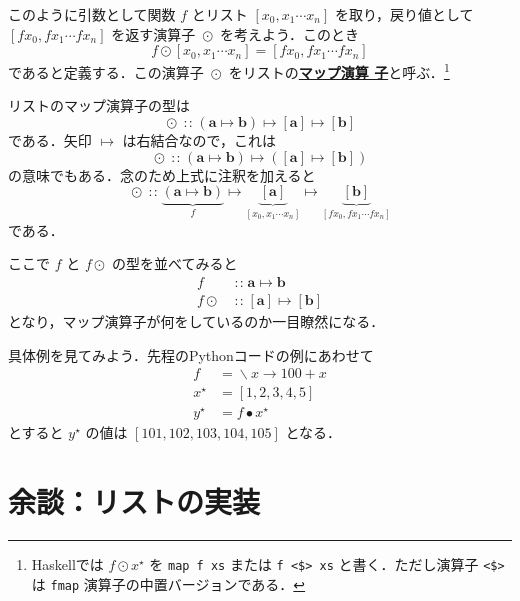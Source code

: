\documentclass[a5paper,twoside,fleqn]{jsbook}
\newcommand{\programminglanguage}[1]{\textsf{#1}}
\newcommand{\haskell}{\programminglanguage{Haskell}}
\newcommand{\python}{\programminglanguage{Python}}
\newcommand{\keyword}[1]{{\underline{\textbf{#1}}}}
\newcommand{\code}[1]{\texttt{#1}}
\DeclareMathOperator{\mIn}{{:\!:}}
\DeclareMathOperator{\mLambda}{\backslash}
\DeclareMathOperator{\mLambdaArrow}{\rightarrow}
\DeclareMathOperator{\mMap}{\bullet}
\DeclareMathOperator{\mMapList}{\odot}
\DeclareMathOperator{\mMapsTo}{\mapsto}
\newcommand{\mType}[1]{\mathbf{#1}}
\newcommand{\mListType}[1]{[\mType{#1}]}
\newcommand{\mListWith}[1]{\left[#1\right]}
\newcommand{\mList}[1]{{#1}^\mathrm{\star}}
\newcommand{\mLambdaExp}[2]{\mLambda{#1}\mLambdaArrow{#2}}
\newcommand{\mProj}[2]{#1\mMapsTo#2}
\begin{document}
このように引数として関数 $f$ とリスト $\mListWith{x_0,x_1\dotsb x_n}$
を取り，戻り値として $\mListWith{fx_0,fx_1\dotsb fx_n}$ を返す演算子
$\mMapList$ を考えよう．このとき
\begin{equation}
f\mMapList\mListWith{x_0,x_1\dotsb x_n} =\mListWith{fx_0,fx_1\dotsb
  fx_n}
\end{equation}
であると定義する．この演算子 $\mMapList$ をリストの\keyword{マップ演算
  子}と呼ぶ．\footnote{\haskell では $f\mMapList\mList{x}$ を
  \code{map f xs} または \code{f <\$> xs} と書く．ただし演算子
  \code{<\$>} は \code{fmap} 演算子の中置バージョンである．}

リストのマップ演算子の型は
\begin{equation}
\mMapList \mIn{} \mProj{ (\mProj{\mType{a}}{\mType{b}}) } {
  \mProj{\mListType{a}}{\mListType{b}} }
\end{equation}
である．矢印 $\mMapsTo$ は右結合なので，これは
\begin{equation}
\mMapList \mIn{} \mProj{ (\mProj{\mType{a}}{\mType{b}}) } {
  (\mProj{\mListType{a}}{\mListType{b}}) }
\end{equation}
の意味でもある．念のため上式に注釈を加えると
\begin{equation}
\mMapList\mIn \underbrace{\left(\mType{a}\mMapsTo\mType{b}\right)}_f
\mMapsTo\underbrace{\mListType{a}}_{\mListWith{x_0,x_1\dotsb x_n}}
\mMapsTo\underbrace{\mListType{b}}_{\mListWith{fx_0,fx_1\dotsb fx_n}}
\end{equation}
である．

ここで $f$ と $f\mMapList$ の型を並べてみると
\begin{align}
f&\mIn\mProj{\mType{a}}{\mType{b}}\\ f\mMapList&\mIn{}\mProj{\mListType{a}}{\mListType{b}}
\end{align}
となり，マップ演算子が何をしているのか一目瞭然になる．

具体例を見てみよう．先程の\python コードの例にあわせて
\begin{align}
f&=\mLambdaExp{x}{100+x}\\ \mList{x}&=\mListWith{1,2,3,4,5}\\ \mList{y}&=f\mMap\mList{x}
\end{align}
とすると $\mList{y}$ の値は $\mListWith{101,102,103,104,105}$ となる．

\section{余談：リストの実装}
\end{document}
